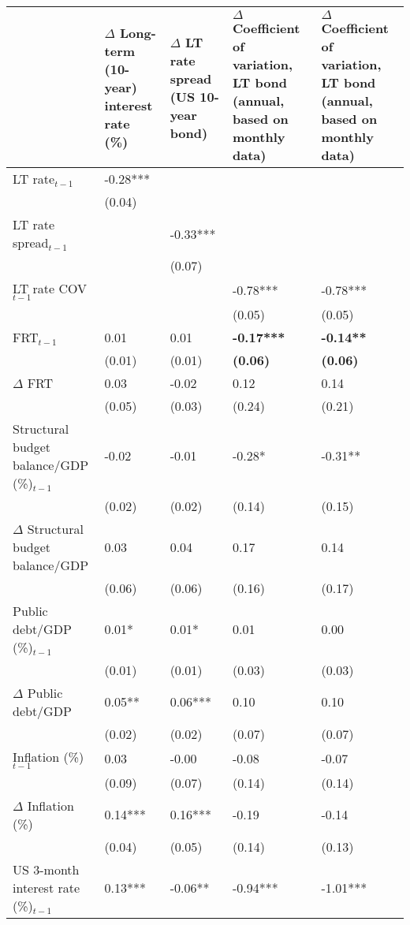 {\tiny
\begin{tabular}{lp{2cm}p{2cm}p{2cm}p{2cm}}
  \hline
 & $\Delta$ Long-term (10-year) interest rate (\%) & $\Delta$ LT rate spread (US 10-year bond) & $\Delta$ Coefficient of variation, LT bond (annual, based on monthly data) & $\Delta$ Coefficient of variation, LT bond (annual, based on monthly data) \\ 
  \hline
LT rate$_{t-1}$ & -0.28*** &  &  &  \\ 
   & (0.04) &  &  &  \\ 
  LT rate spread$_{t-1}$ &  & -0.33*** &  &  \\ 
   &  & (0.07) &  &  \\ 
  LT rate COV$_{t-1}$ &  &  & -0.78*** & -0.78*** \\ 
   &  &  & (0.05) & (0.05) \\ 
  FRT$_{t-1}$ & 0.01 & 0.01 & \textbf{-0.17***} & \textbf{-0.14**} \\ 
   & (0.01) & (0.01) & \textbf{(0.06)} & \textbf{(0.06)} \\ 
  $\Delta$ FRT & 0.03 & -0.02 & 0.12 & 0.14 \\ 
   & (0.05) & (0.03) & (0.24) & (0.21) \\ 
  Structural budget balance/GDP (\%)$_{t-1}$ & -0.02 & -0.01 & -0.28* & -0.31** \\ 
   & (0.02) & (0.02) & (0.14) & (0.15) \\ 
  $\Delta$ Structural budget balance/GDP & 0.03 & 0.04 & 0.17 & 0.14 \\ 
   & (0.06) & (0.06) & (0.16) & (0.17) \\ 
  Public debt/GDP (\%)$_{t-1}$ & 0.01* & 0.01* & 0.01 & 0.00 \\ 
   & (0.01) & (0.01) & (0.03) & (0.03) \\ 
  $\Delta$ Public debt/GDP & 0.05** & 0.06*** & 0.10 & 0.10 \\ 
   & (0.02) & (0.02) & (0.07) & (0.07) \\ 
  Inflation (\%) $_{t-1}$ & 0.03 & -0.00 & -0.08 & -0.07 \\ 
   & (0.09) & (0.07) & (0.14) & (0.14) \\ 
  $\Delta$ Inflation (\%) & 0.14*** & 0.16*** & -0.19 & -0.14 \\ 
   & (0.04) & (0.05) & (0.14) & (0.13) \\ 
  US 3-month interest rate (\%)$_{t-1}$ & 0.13*** & -0.06** & -0.94*** & -1.01*** \\ 

\end{tabular}}
